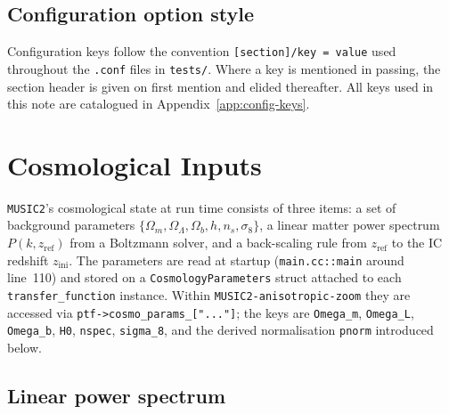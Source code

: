 \documentclass[12pt]{article}
\newcommand{\code}[1]{\texttt{#1}}
\begin{document}
\subsection{Configuration option style}
\label{sec:notation-config}

Configuration keys follow the convention \code{[section]/key = value}
used throughout the \texttt{.conf} files in \code{tests/}.  Where a
key is mentioned in passing, the section header is given on first
mention and elided thereafter.  All keys used in this note are
catalogued in Appendix~\ref{app:config-keys}.

\section{Cosmological Inputs}
\label{sec:cosmo-inputs}

\texttt{MUSIC2}'s cosmological state at run time consists of three
items: a set of background parameters
$\{\Omega_m, \Omega_\Lambda, \Omega_b, h, n_s, \sigma_8\}$, a linear
matter power spectrum $P(k, z_\mathrm{ref})$ from a Boltzmann solver,
and a back-scaling rule from $z_\mathrm{ref}$ to the IC redshift
$z_\mathrm{ini}$.  The parameters are read at startup
(\code{main.cc::main} around line~110) and stored on a
\code{CosmologyParameters} struct attached to each
\code{transfer\_function} instance.  Within \texttt{MUSIC2-anisotropic-zoom}
they are accessed via \code{ptf->cosmo\_params\_["..."]}; the keys are
\code{Omega\_m}, \code{Omega\_L}, \code{Omega\_b}, \code{H0},
\code{nspec}, \code{sigma\_8}, and the derived normalisation
\code{pnorm} introduced below.

\subsection{Linear power spectrum}
\label{sec:cosmo-pk}
\end{document}
